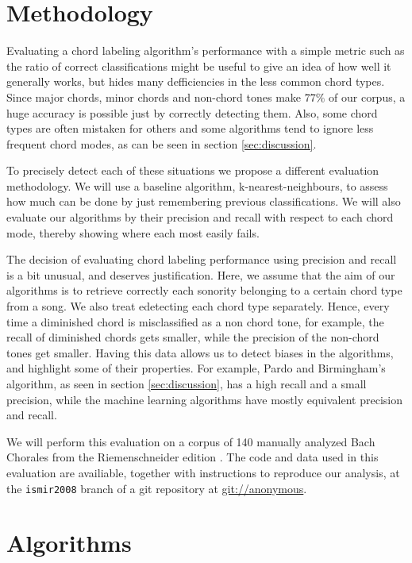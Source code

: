 \documentclass{article}
\begin{document}
\section{Methodology}
\label{sec:methodology}

Evaluating a chord labeling algorithm's performance with a simple
metric such as the ratio of correct classifications might be useful to
give an idea of how well it generally works, but hides many
defficiencies in the less common chord types. Since major chords,
minor chords and non-chord tones make $77\%$ of our corpus, a huge
accuracy is possible just by correctly detecting them. Also, some
chord types are often mistaken for others and some algorithms tend to
ignore less frequent chord modes, as can be seen in section
\ref{sec:discussion}.

To precisely detect each of these situations we propose a different
evaluation methodology. We will use a baseline algorithm,
k-nearest-neighbours, to assess how much can be done by just
remembering previous classifications. We will also evaluate our
algorithms by their precision and recall with respect to each chord
mode, thereby showing where each most easily fails. 

The decision of evaluating chord labeling performance using precision
and recall is a bit unusual, and deserves justification. Here, we
assume that the aim of our algorithms is to retrieve correctly each
sonority belonging to a certain chord type from a song. We also treat
edetecting each chord type separately. Hence, every time a diminished
chord is misclassified as a non chord tone, for example, the recall of
diminished chords gets smaller, while the precision of the non-chord
tones get smaller. Having this data allows us to detect biases in the
algorithms, and highlight some of their properties. For example, Pardo
and Birmingham's algorithm, as seen in section \ref{sec:discussion},
has a high recall and a small precision, while the machine learning
algorithms have mostly equivalent precision and recall.

We will perform this evaluation on a corpus of 140 manually analyzed
Bach Chorales from the Riemenschneider edition \cite{bach:371}. The
code and data used in this evaluation are availiable, together with
instructions to reproduce our analysis, at the \texttt{ismir2008}
branch of a git \cite{baudis:git} repository at \url{git://anonymous}.

\section{Algorithms}
\label{sec:algorithms}
\end{document}
